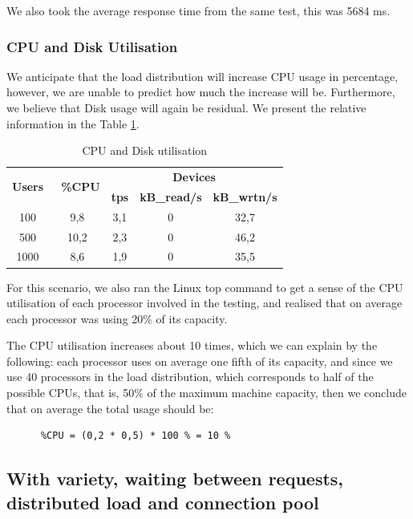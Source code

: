  We also took the average response time from the same test, this was 5684 ms.
  
  \subsubsection{CPU and Disk Utilisation}
  
  We anticipate that the load distribution will increase CPU usage in percentage, however, we are unable to predict how much the increase will be. Furthermore, we believe that Disk usage will again be residual. We present the relative information in the Table \ref{tab:cpu_dist}.


\begin{table}[h!]
\centering
\begin{tabular}{|c|c|c|c|c|} 
\hline
\multirow{2}{*}{\textbf{Users }} & \multirow{2}{*}{\textbf{~\%CPU}} & \multicolumn{3}{c|}{\textbf{Devices}}                     \\ 
\cline{3-5}
                                 &                                  & \textbf{tps} & \textbf{kB\_read/s} & \textbf{kB\_wrtn/s}  \\ 
\hline
100  & 9,8 & 3,1  & 0  &  32,7                   \\ 
\hline
500  & 10,2 & 2,3 & 0 & 46,2                    \\ 
\hline
1000 & 8,6 & 1,9 & 0 & 35,5                 \\ 
\hline
\end{tabular}\caption{\label{tab:cpu_dist}CPU and Disk utilisation}
\end{table}

  For this scenario, we also ran the Linux top command to get a sense of the CPU utilisation of each processor involved in the testing, and realised that on average each processor was using 20\% of its capacity.

  The CPU utilisation increases about 10 times, which we can explain by the following: each processor uses on average one fifth of its capacity, and since we use 40 processors in the load distribution, which corresponds to half of the possible CPUs, that is, 50\% of the maximum machine capacity, then we conclude that on average the total usage should be:
  
  \begin{verbatim}
      %CPU = (0,2 * 0,5) * 100 % = 10 %
  \end{verbatim}
  
  \subsection{With variety, waiting between requests, distributed load and connection pool}
  
